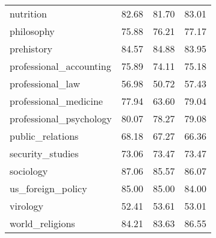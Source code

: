 \begin{table}[t]
\begin{tabular}{L{0.35}C{0.15}C{0.15}C{0.15}}
        nutrition                               & 82.68                    & 81.70                & 83.01                      \\
        philosophy                              & 75.88                    & 76.21                & 77.17                      \\
        prehistory                              & 84.57                    & 84.88                & 83.95                      \\
        professional\_accounting                & 75.89                    & 74.11                & 75.18                      \\
        professional\_law                       & 56.98                    & 50.72                & 57.43                      \\
        professional\_medicine                  & 77.94                    & 63.60                & 79.04                      \\
        professional\_psychology                & 80.07                    & 78.27                & 79.08                      \\
        public\_relations                       & 68.18                    & 67.27                & 66.36                      \\
        security\_studies                       & 73.06                    & 73.47                & 73.47                      \\
        sociology                               & 87.06                    & 85.57                & 86.07                      \\
        us\_foreign\_policy                     & 85.00                    & 85.00                & 84.00                      \\
        virology                                & 52.41                    & 53.61                & 53.01                      \\
        world\_religions                        & 84.21                    & 83.63                & 86.55                      \\
        \bottomrule
    \end{tabular}
\end{table}
\endgroup